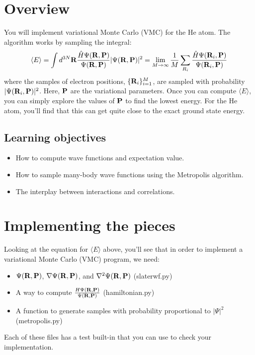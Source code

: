 \documentclass[12pt]{article}
\newcommand{\bR}{{\bf R}}
\newcommand{\bP}{{\bf P}}
\begin{document}
\section{Overview} 

You will implement variational Monte Carlo (VMC) for the He atom. 
The algorithm works by sampling the integral:
\begin{equation}
  \label{eq:vmc}
  \langle
  E
  \rangle
  =
  \int
  d^{3N} \bR
  \frac{\hat{H} \Psi(\bR,\bP)}{\Psi(\bR,\bP)}
  |\Psi(\bR,\bP)|^2
  =
  \lim_{M\to \infty}
  \frac{1}{M}
  \sum_{R_i}
  \frac{\hat{H} \Psi(\bR_i,\bP)}{\Psi(\bR_i,\bP)}
\end{equation}
where the samples of electron positions, $\{\bR_i\}_{i=1}^M$, are sampled with probability $|\Psi(\bR_i,\bP)|^2$.
Here, $\bP$ are the variational parameters.
Once you can compute $\langle E \rangle$, you can simply explore the values of $\bP$ to find the lowest energy.
For the He atom, you'll find that this can get quite close to the exact ground state energy.

\subsection{Learning objectives}
\begin{itemize}
\item How to compute wave functions and expectation value.
\item How to sample many-body wave functions using the Metropolis algorithm.
\item The interplay between interactions and correlations. 
\end{itemize}

\section{Implementing the pieces}

Looking at the equation for $\langle E \rangle$ above, you'll see that in order to implement a variational Monte Carlo (VMC) program, we need:
\begin{itemize}
	\item $\Psi(\bR,\bP)$, $\nabla \Psi(\bR,\bP)$, and $\nabla^2 \Psi(\bR,\bP)$ (slaterwf.py)
	\item A way to compute $\frac{H\Psi(\bR,\bP)}{\Psi(\bR,\bP)}$ (hamiltonian.py)
	\item A function to generate samples with probability proportional to $|\Psi|^2$ (metropolis.py)
\end{itemize}
Each of these files has a test built-in that you can use to check your implementation.
\end{document}
